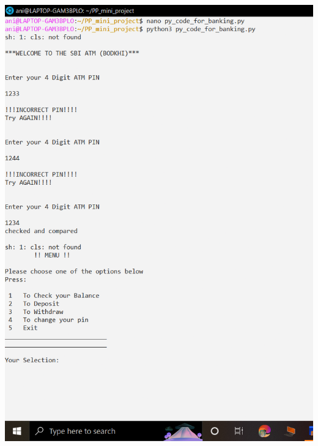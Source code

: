 \documentclass{article}
\begin{document}
\includegraphics[scale=0.35]{output_py_1.png}  \\ \\
\end{document}
